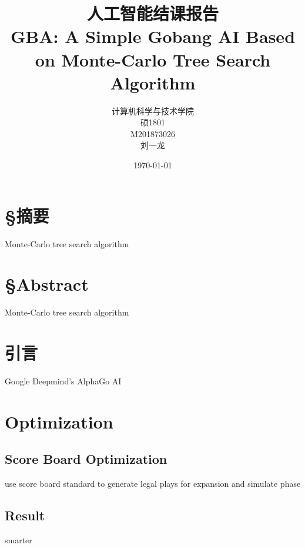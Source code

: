 \documentclass[UTF8,cs4size]{ctexart}
\title{人工智能结课报告\\ \bigskip \textbf{GBA: A Simple Gobang AI Based on Monte-Carlo Tree Search Algorithm}}
\author{计算机科学与技术学院\\ 硕1801\\ M201873026\\ 刘一龙}
\date{\today}
\begin{document}

\maketitle
\newpage

\null\thispagestyle{empty}
\newpage


\section*{\S 摘要}
Monte-Carlo tree search algorithm\cite{wiki:Monte_Carlo_tree_search}\cite{DBLP:conf/ecml/KocsisS06}\cite{DBLP:conf/aiide/ChaslotBSS08}
\newpage

\section*{\S Abstract}
Monte-Carlo tree search algorithm\cite{wiki:Monte_Carlo_tree_search}\cite{DBLP:conf/ecml/KocsisS06}\cite{DBLP:conf/aiide/ChaslotBSS08}
\newpage


\tableofcontents
\newpage

\null\thispagestyle{empty}
\newpage


\section{引言}
Google Deepmind's AlphaGo AI\cite{DBLP:journals/nature/SilverHMGSDSAPL16}\cite{silver2017mastering}
\newpage

\section{Optimization}
\subsection{Score Board Optimization}
use score board standard to generate legal plays for expansion and simulate phase
\subsection{Result}
smarter
\newpage



\newpage
\end{document}

